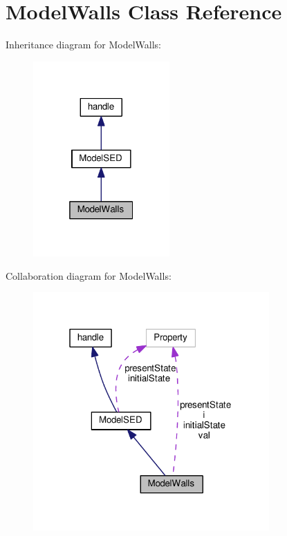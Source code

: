 \hypertarget{class_model_walls}{}\section{Model\+Walls Class Reference}
\label{class_model_walls}


Inheritance diagram for Model\+Walls\+:\nopagebreak
\begin{figure}[H]
\begin{center}
\leavevmode
\includegraphics[width=148pt]{class_model_walls__inherit__graph}
\end{center}
\end{figure}


Collaboration diagram for Model\+Walls\+:\nopagebreak
\begin{figure}[H]
\begin{center}
\leavevmode
\includegraphics[width=256pt]{class_model_walls__coll__graph}
\end{center}
\end{figure}
